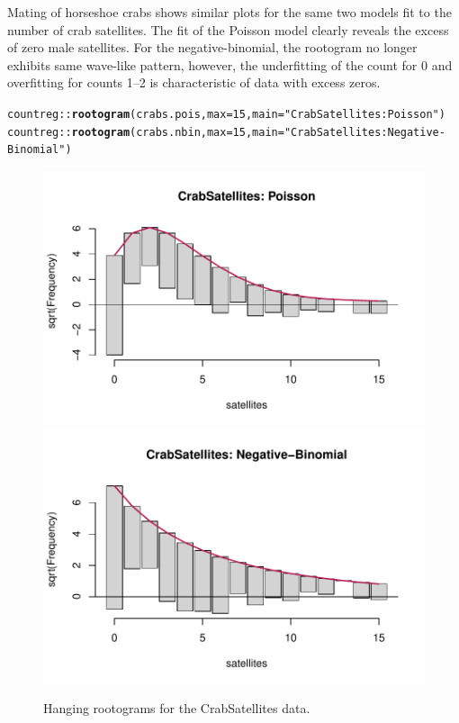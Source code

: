 \documentclass[11pt]{book}\usepackage[]{graphicx}\usepackage[]{color}
\makeatletter
\newcommand{\hlnum}[1]{\textcolor[rgb]{0.686,0.059,0.569}{#1}}%
\newcommand{\hlstr}[1]{\textcolor[rgb]{0.192,0.494,0.8}{#1}}%
\newcommand{\hlopt}[1]{\textcolor[rgb]{0,0,0}{#1}}%
\newcommand{\hlstd}[1]{\textcolor[rgb]{0.345,0.345,0.345}{#1}}%
\newcommand{\hlkwc}[1]{\textcolor[rgb]{0.333,0.667,0.333}{#1}}%
\newcommand{\hlkwd}[1]{\textcolor[rgb]{0.737,0.353,0.396}{\textbf{#1}}}%
\newenvironment{kframe}{%
 \def\at@end@of@kframe{}%
 \ifinner\ifhmode%
  \def\at@end@of@kframe{\end{minipage}}%
  \begin{minipage}{\columnwidth}%
 \fi\fi%
 \def\FrameCommand##1{\hskip\@totalleftmargin \hskip-\fboxsep
 \colorbox{shadecolor}{##1}\hskip-\fboxsep
     \hskip-\linewidth \hskip-\@totalleftmargin \hskip\columnwidth}%
 \MakeFramed {\advance\hsize-\width
   \@totalleftmargin\z@ \linewidth\hsize
   \@setminipage}}%
 {\par\unskip\endMakeFramed%
 \at@end@of@kframe}
\newenvironment{knitrout}{}{} %
\renewenvironment{knitrout}{\small\renewcommand{\baselinestretch}{.85}}{} %
\makeatother
\begin{document}
\begin{Example}[crabs2]{Mating of horseshoe crabs}
 shows similar plots for the same two models fit to the number of
crab satellites.  The fit of the Poisson model clearly reveals the excess of zero male satellites.
For the negative-binomial, the rootogram no longer exhibits same wave-like pattern,
however, the underfitting of the count for 0 and overfitting for counts 1--2 is
characteristic of data with excess zeros.

\begin{knitrout}
\color{fgcolor}\begin{kframe}
\begin{alltt}
\hlstd{countreg}\hlopt{::}\hlkwd{rootogram}\hlstd{(crabs.pois,} \hlkwc{max}\hlstd{=}\hlnum{15}\hlstd{,} \hlkwc{main}\hlstd{=}\hlstr{"CrabSatellites: Poisson"}\hlstd{)}
\hlstd{countreg}\hlopt{::}\hlkwd{rootogram}\hlstd{(crabs.nbin,} \hlkwc{max}\hlstd{=}\hlnum{15}\hlstd{,} \hlkwc{main}\hlstd{=}\hlstr{"CrabSatellites: Negative-Binomial"}\hlstd{)}
\end{alltt}
\end{kframe}\begin{figure}[!htbp]

\centerline{\includegraphics[width=.49\textwidth]{ch09/fig/crabs2-rootogram-1} 
\includegraphics[width=.49\textwidth]{ch09/fig/crabs2-rootogram-2} }

\caption[Hanging rootograms for the CrabSatellites data]{Hanging rootograms for the CrabSatellites data.\label{fig:crabs2-rootogram}}
\end{figure}


\end{knitrout}
\end{Example}
\end{document}
